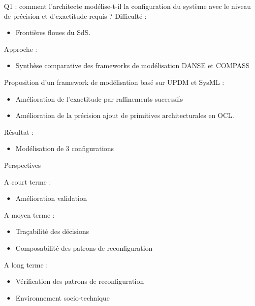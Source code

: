 \begin{frame}{Q1 : comment l’architecte modélise-t-il la configuration du système avec le niveau de précision et d’exactitude requis ?}
Difficulté : 
\begin{itemize}
\item Frontières floues du SdS.\\
\end{itemize}


Approche : 
\begin{itemize}
\item Synthèse comparative des frameworks de modélisation DANSE et COMPASS
\end{itemize}

Proposition d'un framework de modélisation basé sur UPDM et SysML : 
\begin{itemize}
\item Amélioration de l'exactitude par raffinements successifs 
\item Amélioration de la précision ajout de primitives architecturales
en OCL.
\end{itemize} 
Résultat : 
\begin{itemize}
\item Modélisation de 3 configurations
\end{itemize}
\end{frame}

\begin{frame}{Perspectives}
\begin{block}{A court terme :} 
\begin{itemize}
\item Amélioration validation
\end{itemize}
\end{block}

\begin{block}{A moyen terme : }
\begin{itemize}
\item Traçabilité des décisions
\item Composabilité des patrons de reconfiguration
\end{itemize}
\end{block}

\begin{block}{A long terme : }
\begin{itemize}
\item Vérification des patrons de reconfiguration
\item Environnement socio-technique
\end{itemize}
\end{block}
\end{frame}


